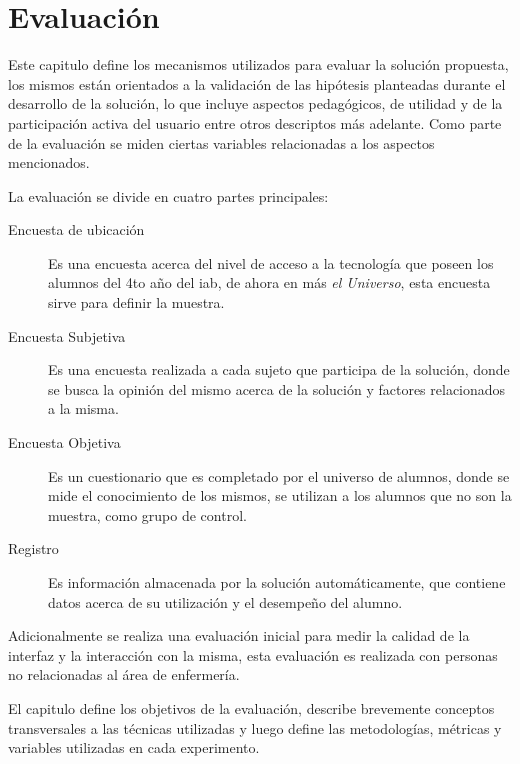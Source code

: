 
\chapter{Evaluación}
\label{chap:evaluacion}


Este capitulo define los mecanismos utilizados para evaluar la solución
propuesta, los mismos están orientados a la validación de las hipótesis
planteadas durante el desarrollo de la solución, lo que incluye aspectos
pedagógicos, de utilidad y de la participación activa del usuario entre otros
descriptos más adelante. Como parte de la evaluación se miden ciertas variables
relacionadas a los aspectos mencionados.

La evaluación se divide en cuatro partes principales:

\begin{description}
    \item[Encuesta de ubicación] Es una encuesta acerca del nivel de acceso a la
        tecnología que poseen los alumnos del 4to año del \Gls{iab}, de ahora en
        más \textit{el Universo}, esta encuesta sirve para definir la muestra.

    \item[Encuesta Subjetiva] Es una encuesta realizada a cada sujeto que
        participa de la solución, donde se busca la opinión del mismo acerca de
        la solución y factores relacionados a la misma. 

    \item[Encuesta Objetiva] Es un cuestionario que es completado por el
        universo de alumnos, donde se mide el conocimiento de los mismos, se
        utilizan a los alumnos que no son la muestra, como grupo de control.

    \item[Registro] Es información almacenada por la solución automáticamente,
        que contiene datos acerca de su utilización y el desempeño del alumno.
\end{description}


Adicionalmente se realiza una evaluación inicial para medir la calidad de la
interfaz y la interacción con la misma, esta evaluación es realizada con
personas no relacionadas al área de enfermería.

El capitulo define los objetivos de la evaluación, describe brevemente conceptos
transversales a las técnicas utilizadas y luego define las metodologías,
métricas y variables utilizadas en cada experimento.








